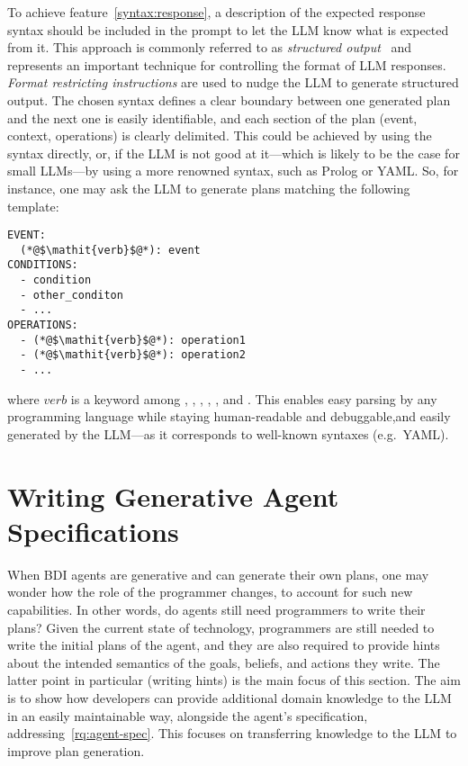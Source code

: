 \documentclass[12pt,a4paper,openright,twoside]{book}
\begin{document}
To achieve feature~\ref{syntax:response}, a description of the expected response syntax should be included in the prompt to let the \ac{LLM} know what is expected from it.
%
This approach is commonly referred to as \emph{structured output}~\cite{TangZPZCG23} and represents an important technique for controlling the format of \ac{LLM} responses.
%
\emph{Format restricting instructions} are used to nudge the \ac{LLM} to generate structured output. The chosen syntax defines a clear boundary between one generated plan and the next one is easily identifiable, and each section of the plan (event, context, operations) is clearly delimited.
%
This could be achieved by using the \agentspeak{} syntax directly, or, if the \ac{LLM} is not good at it---which is likely to be the case for small \acp{LLM}---by using a more renowned syntax, such as Prolog or YAML.
%
So, for instance, one may ask the \ac{LLM} to generate plans matching the following template:
%
\begin{lstlisting}
EVENT:
  (*@$\mathit{verb}$@*): event
CONDITIONS:
  - condition
  - other_conditon
  - ...
OPERATIONS:
  - (*@$\mathit{verb}$@*): operation1
  - (*@$\mathit{verb}$@*): operation2
  - ...
\end{lstlisting}
%
where $\mathit{verb}$ is a keyword among , , , , , and .
%
This enables easy parsing by any programming language while staying human-readable and debuggable,and easily generated by the \ac{LLM}---as it corresponds to well-known syntaxes (e.g.\, YAML).

\section{Writing Generative Agent Specifications}\label{sec:writing}

When \ac{BDI} agents are generative and can generate their own plans, one may wonder how the role of the programmer changes, to account for such new capabilities.
%
In other words, do agents still need programmers to write their plans?
%
Given the current state of technology, programmers are still needed to write the initial plans of the agent, and they are also required to provide hints about the intended semantics of the goals, beliefs, and actions they write.
%
The latter point in particular (writing hints) is the main focus of this section.
%
The aim is to show how developers can provide additional domain knowledge to the \ac{LLM} in an easily maintainable way, alongside the agent's specification, addressing~\ref{rq:agent-spec}.
%
This focuses on transferring knowledge to the \ac{LLM} to improve plan generation.
\end{document}
